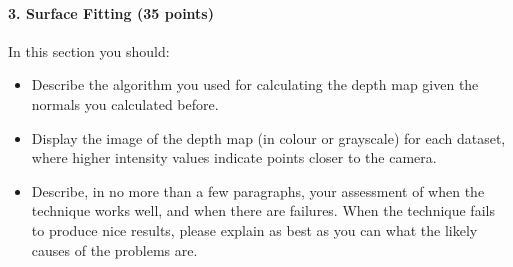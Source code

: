 \documentclass{paper}
\begin{document}
\paragraph{3. Surface Fitting (35 points)}

In this section you should:

\begin{itemize}
\item Describe the algorithm you used for calculating the depth map given the normals you calculated before.
\item Display the image of the depth map (in colour or grayscale) for each dataset, where higher intensity values indicate points closer to the camera.
\item Describe, in no more than a few paragraphs, your assessment of when the technique works well, and when there are failures. When the technique fails to produce nice results, please explain as best as you can what the likely causes of the problems are.
\end{itemize}















 
\end{document}

